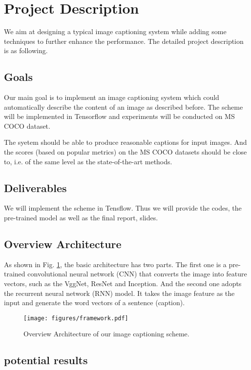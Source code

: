 \documentclass[conference]{IEEEtran}
\begin{document}
\section{Project Description}
We aim at designing a typical image captioning system while adding some techniques to further enhance the performance. The detailed project description is as following.
\subsection{Goals}
Our main goal is to implement an image captioning system which could automatically describe the content of an image as described before. The scheme will be implemented in Tensorflow and experiments will be conducted on MS COCO dataset.

The syetem should be able to produce reasonable captions for input images. And the scores (based on popular metrics) on the MS COCO datasets should be close to, i.e. of the same level as the state-of-the-art methods.

\subsection{Deliverables}

We will implement the scheme in Tensflow. Thus we will provide the codes, the pre-trained model as well as the final report, slides.
\subsection{Overview Architecture}

As shown in Fig. \ref{framework_fig}, the basic architecture has two parts. The first one is a pre-trained convolutional neural network (CNN) that converts the image into feature vectors, such as the VggNet, ResNet and Inception. And the second one adopts the recurrent neural network (RNN) model. It takes the image feature as the input and generate the word vectors of a sentence (caption).

\begin{figure}
  \centering
  \texttt{[image: figures/framework.pdf]}
  \caption{Overview Architecture of our image captioning scheme.}\label{framework_fig}
\end{figure}

\subsection{potential results}
\end{document}
